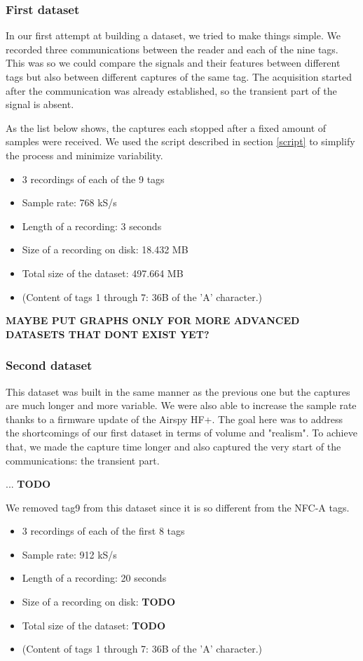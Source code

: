 \subsubsection{First dataset}

In our first attempt at building a dataset, we tried to make things simple. We recorded three communications between the reader and each of the nine tags. This was so we could compare the signals and their features between different tags but also between different captures of the same tag. The acquisition started after the communication was already established, so the transient part of the signal is absent.

As the list below shows, the captures each stopped after a fixed amount of samples were received. We used the script described in section \ref{script} to simplify the process and minimize variability.

\begin{itemize}
  \item 3 recordings of each of the 9 tags
  \item Sample rate: 768 kS/s
  \item Length of a recording: 3 seconds
  \item Size of a recording on disk: 18.432 MB
  \item Total size of the dataset: 497.664 MB
  \item (Content of tags 1 through 7: 36B of the 'A' character.)
\end{itemize}

\textbf{MAYBE PUT GRAPHS ONLY FOR MORE ADVANCED DATASETS THAT DONT EXIST YET?}

\subsubsection{Second dataset}

This dataset was built in the same manner as the previous one but the captures are much longer and more variable. We were also able to increase the sample rate thanks to a firmware update of the Airspy HF+. The goal here was to address the shortcomings of our first dataset in terms of volume and "realism". To achieve that, we made the capture time longer and also captured the very start of the communications: the transient part.

... \textbf{TODO}

We removed tag9 from this dataset since it is so different from the NFC-A tags.

\begin{itemize}
  \item 3 recordings of each of the first 8 tags
  \item Sample rate: 912 kS/s
  \item Length of a recording: 20 seconds
  \item Size of a recording on disk: \textbf{TODO}
  \item Total size of the dataset: \textbf{TODO}
  \item (Content of tags 1 through 7: 36B of the 'A' character.)
\end{itemize}

